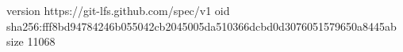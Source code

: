 version https://git-lfs.github.com/spec/v1
oid sha256:fff8bd94784246b055042cb2045005da510366dcbd0d3076051579650a8445ab
size 11068
